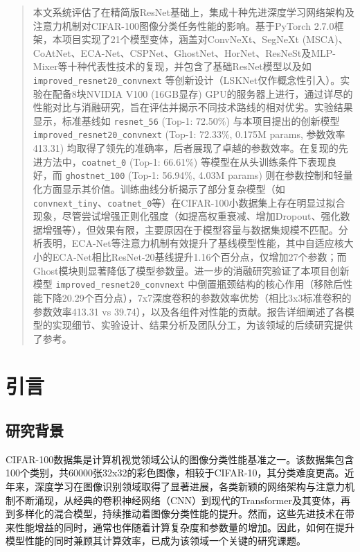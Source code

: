 \documentclass[a4paper]{article}
\begin{document}
\clearpage
\begin{abstract}
\noindent
本文系统评估了在精简版ResNet基础上，集成十种先进深度学习网络架构及注意力机制对CIFAR-100图像分类任务性能的影响。基于PyTorch 2.7.0框架，本项目实现了21个模型变体，涵盖对ConvNeXt、SegNeXt (MSCA)、CoAtNet、ECA-Net、CSPNet、GhostNet、HorNet、ResNeSt及MLP-Mixer等十种代表性技术的复现，并包含了基础ResNet模型以及如 \texttt{improved\_resnet20\_convnext} 等创新设计（LSKNet仅作概念性引入）。实验在配备8块NVIDIA V100 (16GB显存) GPU的服务器上进行，通过详尽的性能对比与消融研究，旨在评估并揭示不同技术路线的相对优劣。实验结果显示，标准基线如 \texttt{resnet\_56} (Top-1: 72.50\%) 与本项目提出的创新模型 \texttt{improved\_resnet20\_convnext} (Top-1: 72.33\%, 0.175M params, 参数效率413.31) 均取得了领先的准确率，后者展现了卓越的参数效率。在复现的先进方法中，\texttt{coatnet\_0} (Top-1: 66.61\%) 等模型在从头训练条件下表现良好，而 \texttt{ghostnet\_100} (Top-1: 56.94\%, 4.03M params) 则在参数控制和轻量化方面显示其价值。训练曲线分析揭示了部分复杂模型（如\texttt{convnext\_tiny}、\texttt{coatnet\_0}等）在CIFAR-100小数据集上存在明显过拟合现象，尽管尝试增强正则化强度（如提高权重衰减、增加Dropout、强化数据增强等），但效果有限，主要原因在于模型容量与数据集规模不匹配。分析表明，ECA-Net等注意力机制有效提升了基线模型性能，其中自适应核大小的ECA-Net相比ResNet-20基线提升1.16个百分点，仅增加27个参数；而Ghost模块则显著降低了模型参数量。进一步的消融研究验证了本项目创新模型 \texttt{improved\_resnet20\_convnext} 中倒置瓶颈结构的核心作用（移除后性能下降20.29个百分点），7x7深度卷积的参数效率优势（相比3x3标准卷积的参数效率413.31 vs 39.74），以及各组件对性能的贡献。报告详细阐述了各模型的实现细节、实验设计、结果分析及团队分工，为该领域的后续研究提供了参考。
\end{abstract}
\clearpage

\tableofcontents
\newpage

\section{引言}
\subsection{研究背景}
CIFAR-100数据集是计算机视觉领域公认的图像分类性能基准之一。该数据集包含100个类别，共60000张32x32的彩色图像，相较于CIFAR-10，其分类难度更高。近年来，深度学习在图像识别领域取得了显著进展，各类新颖的网络架构与注意力机制不断涌现，从经典的卷积神经网络（CNN）到现代的Transformer及其变体，再到多样化的混合模型，持续推动着图像分类性能的提升。然而，这些先进技术在带来性能增益的同时，通常也伴随着计算复杂度和参数量的增加。因此，如何在提升模型性能的同时兼顾其计算效率，已成为该领域一个关键的研究课题。
\end{document}
